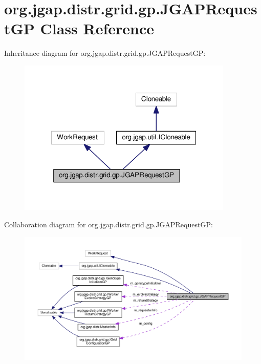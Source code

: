 \hypertarget{classorg_1_1jgap_1_1distr_1_1grid_1_1gp_1_1_j_g_a_p_request_g_p}{\section{org.\-jgap.\-distr.\-grid.\-gp.\-J\-G\-A\-P\-Request\-G\-P Class Reference}
\label{classorg_1_1jgap_1_1distr_1_1grid_1_1gp_1_1_j_g_a_p_request_g_p}
}


Inheritance diagram for org.\-jgap.\-distr.\-grid.\-gp.\-J\-G\-A\-P\-Request\-G\-P\-:
\nopagebreak
\begin{figure}[H]
\begin{center}
\leavevmode
\includegraphics[width=290pt]{classorg_1_1jgap_1_1distr_1_1grid_1_1gp_1_1_j_g_a_p_request_g_p__inherit__graph}
\end{center}
\end{figure}


Collaboration diagram for org.\-jgap.\-distr.\-grid.\-gp.\-J\-G\-A\-P\-Request\-G\-P\-:
\nopagebreak
\begin{figure}[H]
\begin{center}
\leavevmode
\includegraphics[width=350pt]{classorg_1_1jgap_1_1distr_1_1grid_1_1gp_1_1_j_g_a_p_request_g_p__coll__graph}
\end{center}
\end{figure}
